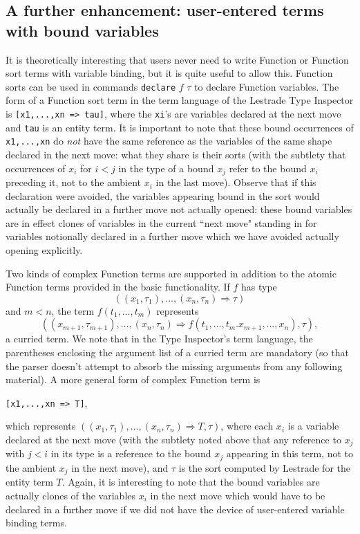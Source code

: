 \documentclass{article}
\begin{document}
\subsection{A further enhancement:  user-entered terms with bound variables}

It is theoretically interesting that users never need to write Function or Function sort terms with variable binding, but it is quite useful to allow this.  Function sorts can be used in commands {\tt declare} $f$ $\tau$ to declare Function variables.  The form of a Function sort term in the term language of the Lestrade Type Inspector is {\tt [x1,...,xn => tau]}, where the {\tt xi}'s are variables declared at the next move and {\tt tau} is an entity term.  It is important to note that these bound occurrences of {\tt x1,...,xn} do {\em not\/} have the same reference as the variables of the same shape declared in the next move:  what they share is their sorts (with the subtlety that occurrences of $x_i$ for $i<j$ in the type of a bound $x_j$ refer to the bound $x_i$ preceding it, not to the ambient $x_i$ in the last move).  Observe that if this declaration were avoided, the variables appearing bound in the sort would actually be declared in a further move not actually opened:  these bound variables are in effect clones of variables in the current ``next move" standing in for variables notionally declared in a further move which we have avoided actually opening explicitly.

Two kinds of complex Function terms are supported in addition to the atomic Function terms provided in the basic functionality.  If $f$ has
type $$((x_1,\tau_1),\ldots,(x_n,\tau_n) \Rightarrow \tau)$$ and $m<n$, the term $f(t_1,\ldots,t_m)$ represents
$$((x_{m+1},\tau_{m+1}),\ldots,(x_n,\tau_n) \Rightarrow f(t_1,\ldots,t_m.x_{m+1},\ldots,x_n),\tau),$$ a curried term.  We note that in the Type Inspector's term language, the parentheses enclosing the argument list of a curried term are mandatory (so that the parser doesn't attempt to absorb the missing arguments from any following material).  A more general form of complex Function term is \begin{center}{\tt [x1,...,xn => T]},\end{center}which represents
$((x_1,\tau_1),\ldots,(x_n,\tau_n) \Rightarrow T,\tau)$, where each $x_i$ is a variable declared at the next move (with the subtlety noted above that
any reference to $x_j$ with $j<i$ in its type is a reference to the bound $x_j$ appearing in this term, not to the ambient $x_j$ in the next move), and $\tau$ is the sort computed by Lestrade for the entity term $T$.  Again, it is interesting to note that the bound variables are actually clones of the variables $x_i$ in the next move which would have to be declared in a further move if we did not have the device of user-entered variable binding terms.
\end{document}
